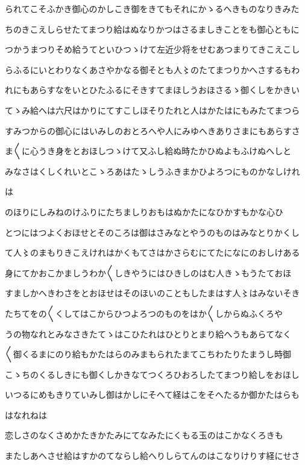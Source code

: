 \documentclass[a4paper,11pt,landscape]{ltjtarticle}
\begin{document}
られてこそふかき御心のかしこき御をきてもそれにかゝるへきものなりきみた
\par\medskip
ちのきこえしらせたてまつり給はぬなりかつはさるましきことをも御心ともに
\par\medskip
つかうまつりそめ給うてといひつゝけて左近少将をせむあつまりてきこえこし
\par\medskip
らふるにいとわりなくあさやかなる御そとも人〻のたてまつりかへさするもわ
\par\medskip
れにもあらすなをいとひたふるにそきすてまほしうおほさるゝ御くしをかきい
\par\medskip
てゝみ給へは六尺はかりにてすこしほそりたれと人はかたはにもみたてまつら
\par\medskip
すみつからの御心にはいみしのおとろへや人にみゆへきありさまにもあらすさ
\par\medskip
ま〱に心うき身をとおほしつゝけて又ふし給ぬ時たかひぬよもふけぬへしと
\par\medskip
みなさはくしくれいとこゝろあはたゝしうふきまかひよろつにものかなしけれ
\par\medskip
は
\par\medskip
のほりにしみねのけふりにたちましりおもはぬかたになひかすもかな心ひ
\par\medskip
とつにはつよくおほせとそのころは御はさみなとやうのものはみなとりかくし
\par\medskip
て人〻のまもりきこえけれはかくもてさはかさらむにてたになにのおしけある
\par\medskip
身にてかおこかましうわか〱しきやうにはひきしのはむ人きゝもうたておほ
\par\medskip
すましかへきわさをとおほせはそのほいのこともしたまはす人〻はみないそき
\par\medskip
たちてをの〱くしてはこからひつよろつのものをはか〱しからぬふくろや
\par\medskip
うの物なれとみなさきたてゝはこひたれはひとりとまり給へうもあらてなく
\par\medskip
〱御くるまにのり給もかたはらのみまもられたまてこちわたりたまうし時御
\par\medskip
こゝちのくるしきにも御くしかきなてつくろひおろしたてまつり給しをおほし
\par\medskip
いつるにめもきりていみし御はかしにそへて経はこをそへたるか御かたはらも
\par\medskip
はなれねは
\par\medskip
恋しさのなくさめかたきかたみにてなみたにくもる玉のはこかなくろきも
\par\medskip
またしあへさせ給はすかのてならし給へりしらてんのはこなりけりす経にせさ
\end{document}

